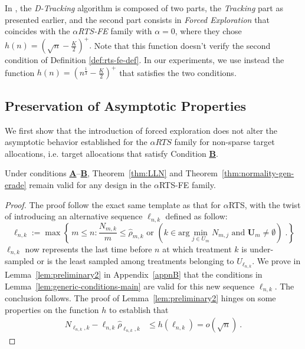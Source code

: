 \begin{example}
	In \cite{garivier2016optimal}, the \textit{D-Tracking} algorithm is composed of two parts, the \textit{Tracking} part as presented earlier, and the second part consists in \textit{Forced Exploration} that coincides with the \textit{\(\alpha\)RTS-FE} family with \(\alpha=0\), where they chose \(h(n) = \left(\sqrt{n} - \frac{K}{2}\right)^+.\) Note that this function doesn't verify the second condition of Definition \ref{def:rts-fe-def}. In our experiments, we use instead the function \(h(n) = \left(n^{\frac{1}{3}} - \frac{K}{2}\right)^+\) that satisfies the two conditions.
\end{example}


\subsection{Preservation of Asymptotic Properties}

We first show that the introduction of forced exploration does not alter the asymptotic behavior established for the \(\alpha RTS\) family for non-sparse target allocations, i.e. target allocations that satisfy {Condition} \hyperlink{CB}{\textbf{B}}.

\begin{theorem}\label{thm:forced} Under conditions \hyperlink{CA}{\textbf{A}}--\hyperlink{CB}{\textbf{B}}, Theorem~\ref{thm:LLN} and Theorem~\ref{thm:normality-gen-erade} %
	remain valid for any design in the \(\alpha\)RTS-FE family.
\end{theorem}

\begin{proof} The proof follow the exact same template as that for $\alpha$RTS, with the twist of introducing an alternative sequence $\ell_{n,k}$ defined as follow:
\begin{equation*}
	\ell_{n,k} := \max \left\{\, m \leq n : \frac{N_{m,k}}{m} \leq \hat{\rho}_{m,k} \text{ or } \left(k \in \text{arg}\!\min_{j \in U_m} N_{m,j}\text{ and } \mathbf{U}_m \neq \emptyset\right) \;.\right\}
\end{equation*}
$\ell_{n,k}$ now represents the last time before \(n\) at which treatment \(k\) is under-sampled or is the least sampled among treatments belonging to \(U_{\ell_{n,k}}\). We prove in Lemma~\ref{lem:preliminary2} in Appendix~\ref{appnB} that the conditions in Lemma~\ref{lem:generic-conditions-main} are valid for this new sequence $\ell_{n,k}$. The conclusion follows. The proof of Lemma~\ref{lem:preliminary2} hinges on some properties on the function \(h\) to establish that
\begin{align*}
	N_{\ell_{n,k},k} - \ell_{n,k} \hat{\rho}_{\ell_{n,k},k}
	&\leq h(\ell_{n,k})
	= o(\sqrt{n})
	\: .
\end{align*}
\end{proof}

